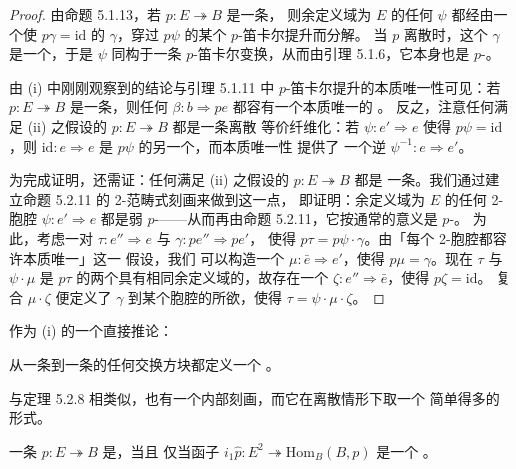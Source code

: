 \begin{proof}
由命题 5.1.13，若 $p\colon E\twoheadrightarrow B$ 是一条\trCartesianFibration，
则余定义域为 $E$ 的任何\trNaturalTransformation{} $\psi$ 都经由一个使
$p\gamma=\mathrm{id}$ 的\trNaturalTransformation{} $\gamma$，穿过 $p\psi$ 的某个
$p$-笛卡尔提升而分解。
当 $p$ 离散时，这个 $\gamma$ 是一个\trIsomorphism，于是 $\psi$ 同构于一条
$p$-笛卡尔变换，从而由引理 5.1.6，它本身也是 $p$-\trCartesian。

由 (i) 中刚刚观察到的结论与引理 5.1.11 中 $p$-笛卡尔提升的本质唯一性可见：若
$p\colon E\twoheadrightarrow B$ 是一条\trDiscreteCartesianFibration，则任何%
\trNaturalTransformation{} $\beta\colon b\Rightarrow pe$ 都容有一个本质唯一的%
\trLifting。
反之，注意任何满足 (ii) 之假设的 $p\colon E\twoheadrightarrow B$ 都是一条离散%
等价纤维化：若 $\psi\colon e'\Rightarrow e$ 使得 $p\psi=\mathrm{id}$，则
$\mathrm{id}\colon e\Rightarrow e$ 是 $p\psi$ 的另一个\trLifting，而本质唯一性%
提供了%
一个逆\trIsomorphism{} $\psi^{-1}\colon e\Rightarrow e'$。

为完成证明，还需证：任何满足 (ii) 之假设的 $p\colon E\twoheadrightarrow B$ 都是%
一条\trCartesianFibration。我们通过建立命题 5.2.11 的 2-范畴式刻画来做到这一点，
即证明：余定义域为 $E$ 的任何 2-胞腔 $\psi\colon e'\Rightarrow e$ 都是弱
$p$-\trCartesian——从而再由命题 5.2.11，它按通常的意义是 $p$-\trCartesian。
为此，考虑一对 $\tau\colon e''\Rightarrow e$ 与 $\gamma\colon pe''\Rightarrow pe'$，
使得 $p\tau=p\psi\cdot\gamma$。由「每个 2-胞腔都容许本质唯一\trLifting」这一%
假设，我们
可以构造一个\trLifting{} $\mu\colon\bar{e}\Rightarrow e'$，使得 $p\mu=\gamma$。现在 $\tau$
与 $\psi\cdot\mu$ 是 $p\tau$ 的两个具有相同余定义域的\trLifting，故存在一个%
\trIsomorphism{} $\zeta\colon e''\Rightarrow\bar{e}$，使得 $p\zeta=\mathrm{id}$。
复合 $\mu\cdot\zeta$ 便定义了 $\gamma$ 到某个胞腔的所欲\trLifting，使得
$\tau=\psi\cdot\mu\cdot\zeta$。
\end{proof}

作为 (i) 的一个直接推论：

\begin{corollary}\label{cor:square-into-discrete-cartesian}
从一条\trCartesianFibration{}到一条\trDiscreteCartesianFibration{}的任何交换方块都定义一个%
\trCartesianFunctor。
\end{corollary}

与定理 5.2.8 相类似，\trDiscreteCartesianFibration{}也有一个内部刻画，而它在离散情形下取一个%
简单得多的形式。

\begin{proposition}\label{prop:internal-characterization-discrete}
一条\trIsofibration{} $p\colon E\twoheadrightarrow B$ 是\trDiscreteCartesianFibration，当且%
仅当函子
$i_{1}\hat{p}\colon E^{2}\twoheadrightarrow\mathrm{Hom}_{B}(B,p)$ 是一个%
\trTrivialFibration。
\end{proposition}

